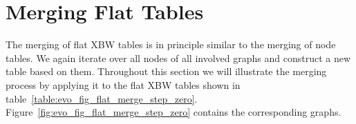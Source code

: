 \documentclass[a4paper,12pt,twoside,BCOR=10mm]{scrbook}
\begin{document}
\section{Merging Flat Tables}
\label{sec:merging_flat_tables}
%

The merging of flat XBW tables is in principle similar to the merging of node tables.
We again iterate over all nodes of all involved graphs and construct a new table
based on them. Throughout this section we will illustrate the merging process
by applying it to the flat XBW tables shown in
table~\ref{table:evo_fig_flat_merge_step_zero}.
Figure~\ref{fig:evo_fig_flat_merge_step_zero} contains the corresponding graphs.
\end{document}
